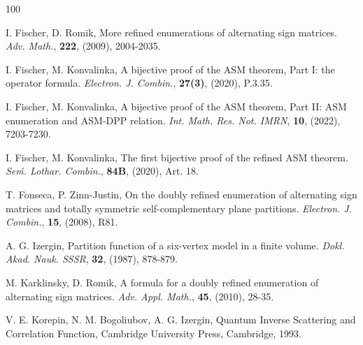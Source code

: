 \documentclass[12pt, a4paper]{amsart} %
\numberwithin{equation}{section}
\begin{document}
\begin{thebibliography}{100}

I. Fischer, D. Romik, More refined enumerations of alternating sign matrices. {\em Adv. Math.}, {\bf 222}, (2009), 2004-2035.




I. Fischer, M. Konvalinka, A bijective proof of the ASM theorem, Part I: the operator formula. {\em Electron. J. Combin.}, {\bf 27(3)}, (2020), P.3.35.

I. Fischer, M. Konvalinka, A bijective proof of the ASM theorem, Part II: ASM enumeration and ASM-DPP relation. {\em Int. Math. Res. Not. IMRN}, {\bf 10}, (2022), 7203-7230.

I. Fischer, M. Konvalinka, The first bijective proof of the refined ASM theorem. {\em Se\'m. Lothar. Combin.}, {\bf 84B}, (2020), Art. 18.



T. Fonseca, P. Zinn-Justin, On the doubly refined enumeration of alternating sign matrices and totally symmetric self-complementary plane partitions. {\em Electron. J. Combin.}, {\bf 15}, (2008), R81.

A. G. Izergin, Partition function of a six-vertex model in a finite volume. {\em Dokl. Akad. Nauk. SSSR}, {\bf 32}, (1987), 878-879.

M. Karklinsky, D. Romik, A formula for a doubly refined enumeration of alternating sign matrices. {\em Adv. Appl. Math.}, {\bf 45}, (2010), 28-35.


V. E. Korepin, N. M. Bogoliubov, A. G. Izergin, Quantum Inverse Scattering and Correlation Function, Cambridge University Press, Cambridge, 1993.


\end{thebibliography}
\end{document}
